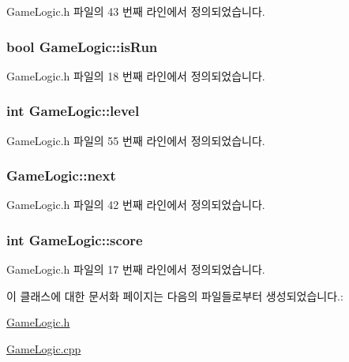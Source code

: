 Game\+Logic.\+h 파일의 43 번째 라인에서 정의되었습니다.

\subsubsection[{\texorpdfstring{is\+Run}{isRun}}]{\setlength{\rightskip}{0pt plus 5cm}bool Game\+Logic\+::is\+Run}\hypertarget{class_game_logic_a6a95fb9e16b411f1149dcdb463cdc3a5}{}\label{class_game_logic_a6a95fb9e16b411f1149dcdb463cdc3a5}


Game\+Logic.\+h 파일의 18 번째 라인에서 정의되었습니다.

\subsubsection[{\texorpdfstring{level}{level}}]{\setlength{\rightskip}{0pt plus 5cm}int Game\+Logic\+::level\hspace{0.3cm}{\ttfamily [private]}}\hypertarget{class_game_logic_aca26b3a67b4bb5d5d477f9873826aae8}{}\label{class_game_logic_aca26b3a67b4bb5d5d477f9873826aae8}


Game\+Logic.\+h 파일의 55 번째 라인에서 정의되었습니다.

\subsubsection[{\texorpdfstring{next}{next}}]{ Game\+Logic\+::next\hspace{0.3cm}{\ttfamily [private]}}\hypertarget{class_game_logic_a42f7be1948bf9cf0a8ff05d7544f62bc}{}\label{class_game_logic_a42f7be1948bf9cf0a8ff05d7544f62bc}


Game\+Logic.\+h 파일의 42 번째 라인에서 정의되었습니다.

\subsubsection[{\texorpdfstring{score}{score}}]{\setlength{\rightskip}{0pt plus 5cm}int Game\+Logic\+::score}\hypertarget{class_game_logic_a64ebe1cc14b91b935608ae4455fe3745}{}\label{class_game_logic_a64ebe1cc14b91b935608ae4455fe3745}


Game\+Logic.\+h 파일의 17 번째 라인에서 정의되었습니다.



이 클래스에 대한 문서화 페이지는 다음의 파일들로부터 생성되었습니다.\+:\begin{DoxyCompactItemize}
\item 
\hyperlink{_game_logic_8h}{Game\+Logic.\+h}\item 
\hyperlink{_game_logic_8cpp}{Game\+Logic.\+cpp}\end{DoxyCompactItemize}
